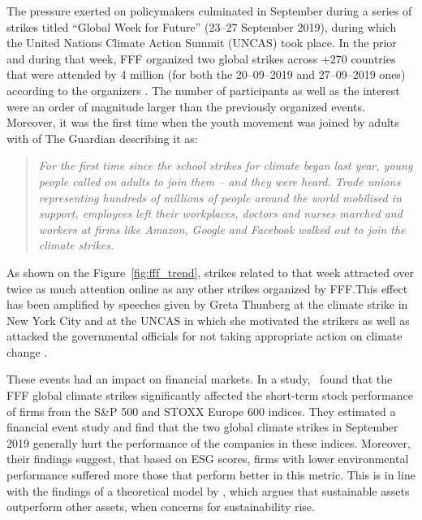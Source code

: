 \documentclass[12pt]{article}
\begin{document}
The pressure exerted on policymakers culminated in September during a series of strikes titled ``Global Week for Future'' (23--27 September 2019), during which the United Nations Climate Action Summit (UNCAS) took place. In the prior and during that week, FFF organized two global strikes across +270 countries that were attended by 4 million (for both the 20--09--2019 and 27--09--2019 ones) according to the organizers \parencite{fffStrikeStats}. The number of participants as well as the interest were an order of magnitude larger than the previously organized events. Moreover, it was the first time when the youth movement was joined by adults with \citeauthor{watts2019climate} of The Guardian describing it as:

\begin{quote}
    \small
    \textit{For the first time since the school strikes for climate began last year, young people called on adults to join them – and they were heard. Trade unions representing hundreds of millions of people around the world mobilised in support, employees left their workplaces, doctors and nurses marched and workers at firms like Amazon, Google and Facebook walked out to join the climate strikes.} \parencite{watts2019climate}
\end{quote}

As shown on the Figure~\ref{fig:fff_trend}, strikes related to that week attracted over twice as much attention online as any other strikes organized by FFF.\@ This effect has been amplified by speeches given by Greta Thunberg at the climate strike in New York City and at the UNCAS in which she motivated the strikers as well as attacked the governmental officials for not taking appropriate action on climate change \parencite{2019thunberg}. 

These events had an impact on financial markets. In a \citeyear{schusterStockPriceReactions2023} study,~\citeauthor{schusterStockPriceReactions2023} found that the FFF global climate strikes significantly affected the short-term stock performance of firms from the S\&P 500 and STOXX Europe 600 indices. They estimated a financial event study and find that the two global climate strikes in September 2019 generally hurt the performance of the companies in these indices. Moreover, their findings suggest, that based on ESG scores, firms with lower environmental performance suffered more those that perform better in this metric.  This is in line with the findings of a theoretical model by \textcite{pastorSustainableInvestingEquilibrium2021}, which argues that sustainable assets outperform other assets, when concerns for sustainability rise.
\end{document}

